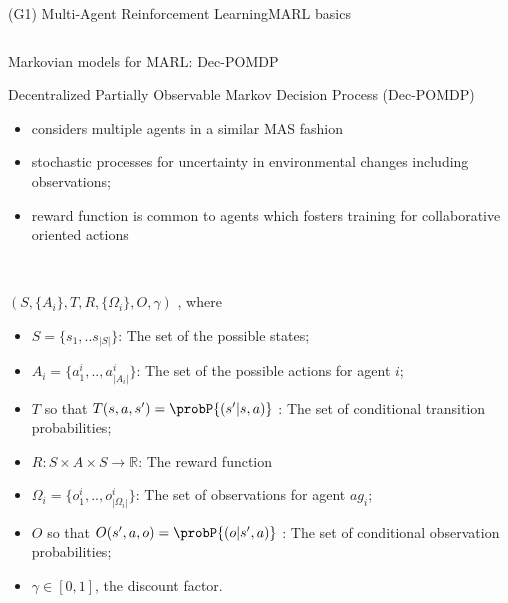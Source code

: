 \begin{frame}{(G1) Multi-Agent Reinforcement Learning}{MARL basics}
\begin{columns}
\begin{column}{0.7\textwidth}
            \begin{center}
                \begin{minipage}{0.95\linewidth}
                    \centering
                    \begin{block}{Markovian models for MARL: Dec-POMDP}
                        {\small
                            Decentralized Partially Observable Markov Decision Process (Dec-POMDP)~\cite{Oliehoek2016}
                            \begin{itemize}
                                \item considers multiple agents in a similar MAS fashion
                                \item stochastic processes for uncertainty in environmental changes including observations;
                                \item reward function is common to agents which fosters training for collaborative oriented actions~\cite{Beynier2013}
                            \end{itemize}
                        }
                        \

                        { \scriptsize

                        $(S,\{A_i\},T,R,\{\Omega_i\},O,\gamma)$ , where
                        \begin{itemize}
                            \item $S = \{s_1, ..s_{|S|}\}$: The set of the possible states;
                            \item $A_{i} = \{a_{1}^{i},..,a_{|A_{i}|}^{i}\}$: The set of the possible actions for agent $i$;
                            \item $T$ so that $T(s,a,s') = \probP{(s'|s,a)}$ : The set of conditional transition probabilities;
                            \item $R: S \times A \times S \rightarrow \mathbb{R}$: The reward function
                            \item $\Omega_{i} = \{o_{1}^{i},..,o_{|\Omega_{i}|}^{i}\}$: The set of observations for agent $ag_i$;
                            \item $O$ so that $O(s',a,o) = \probP{(o|s',a)}$ : The set of conditional observation probabilities;
                            \item $\gamma \in [0,1]$, the discount factor.
                        \end{itemize}

                        }

                    \end{block}

                \end{minipage}
            \end{center}

        \end{column}

    \end{columns}

\end{frame}

